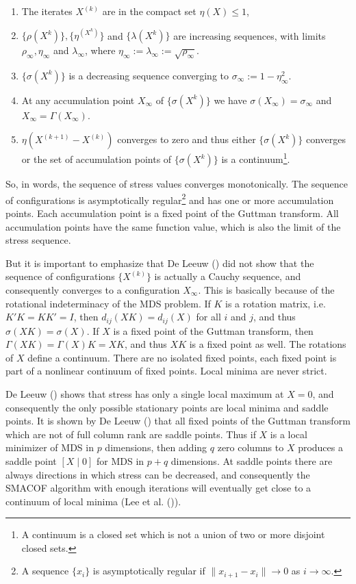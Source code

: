 \documentclass[
  12pt,
  letterpaper,
  DIV=11,
  numbers=noendperiod]{scrartcl}
\providecommand{\tightlist}{%
  \setlength{\itemsep}{0pt}\setlength{\parskip}{0pt}}
\begin{document}
\begin{enumerate}
\def\labelenumi{\arabic{enumi}.}
\tightlist
\item
  The iterates \(X^{(k)}\) are in the compact set \(\eta(X)\leq 1\),
\item
  \(\{\rho(X^{k})\}, \{\eta^(X^{k})\}\) and \(\{\lambda(X^{k})\}\) are
  increasing sequences, with limits \(\rho_\infty,\eta_\infty\) and
  \(\lambda_\infty\), where
  \(\eta_\infty:=\lambda_\infty:=\sqrt{\rho_\infty}\).
\item
  \(\{\sigma(X^{k})\}\) is a decreasing sequence converging to
  \(\sigma_\infty:=1-\eta^2_\infty\).
\item
  At any accumulation point \(X_\infty\) of \(\{\sigma(X^{k})\}\) we
  have \(\sigma(X_\infty)=\sigma_\infty\) and
  \(X_\infty=\Gamma(X_\infty)\).
\item
  \(\eta(X^{(k+1)}-X^{(k)})\) converges to zero and thus either
  \(\{\sigma(X^{k})\}\) converges or the set of accumulation points of
  \(\{\sigma(X^{k})\}\) is a
  continuum\footnote{A continuum is a closed set which is not a union 
  of two or more disjoint closed sets.}.
\end{enumerate}

So, in words, the sequence of stress values converges monotonically. The
sequence of configurations is asymptotically
regular\footnote{A sequence $\{x_i\}$ is asymptotically regular if 
$\|x_{i+1}-x_i\|\rightarrow 0$ as $i\rightarrow\infty$.} and has one or
more accumulation points. Each accumulation point is a fixed point of
the Guttman transform. All accumulation points have the same function
value, which is also the limit of the stress sequence.

But it is important to emphasize that De Leeuw
() did not show that the sequence of
configurations \(\{X^{(k)}\}\) is actually a Cauchy sequence, and
consequently converges to a configuration \(X_\infty\). This is
basically because of the rotational indeterminacy of the MDS problem. If
\(K\) is a rotation matrix, i.e.~\(K'K=KK'=I\), then
\(d_{ij}(XK)=d_{ij}(X)\) for all \(i\) and \(j\), and thus
\(\sigma(XK)=\sigma(X)\). If \(X\) is a fixed point of the Guttman
transform, then \(\Gamma(XK)=\Gamma(X)K=XK\), and thus \(XK\) is a fixed
point as well. The rotations of \(X\) define a continuum. There are no
isolated fixed points, each fixed point is part of a nonlinear continuum
of fixed points. Local minima are never strict.

De Leeuw () shows that stress has only
a single local maximum at \(X=0\), and consequently the only possible
stationary points are local minima and saddle points. It is shown by De
Leeuw () that all fixed points of the
Guttman transform which are not of full column rank are saddle points.
Thus if \(X\) is a local minimizer of MDS in \(p\) dimensions, then
adding \(q\) zero columns to \(X\) produces a saddle point \([X\mid 0]\)
for MDS in \(p+q\) dimensions. At saddle points there are always
directions in which stress can be decreased, and consequently the SMACOF
algorithm with enough iterations will eventually get close to a
continuum of local minima (Lee et al.
()).
\end{document}

